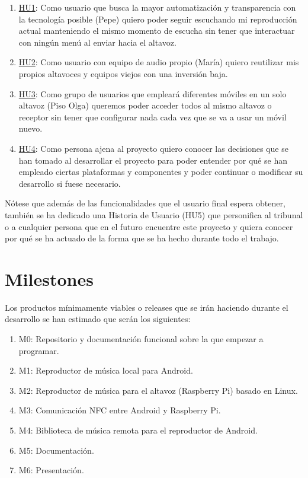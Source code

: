 \begin{enumerate}
    \item \href{https://github.com/migueorg/One-touch-music-streaming-TFG-ETSIIT/issues/10}{HU1}: Como usuario que busca la mayor automatización y transparencia
    con la tecnología posible (Pepe) quiero poder seguir escuchando mi
    reproducción actual manteniendo el mismo momento de escucha sin tener que
    interactuar con ningún menú al enviar hacia el altavoz.
    \item \href{https://github.com/migueorg/One-touch-music-streaming-TFG-ETSIIT/issues/11}{HU2}: Como usuario con equipo de audio propio (María) quiero reutilizar
    mis propios altavoces y equipos viejos con una inversión baja.
    \item \href{https://github.com/migueorg/One-touch-music-streaming-TFG-ETSIIT/issues/13}{HU3}: Como grupo de usuarios que empleará diferentes móviles en un solo
    altavoz (Piso Olga) queremos poder acceder todos al mismo altavoz o receptor
    sin tener que configurar nada cada vez que se va a usar un móvil nuevo.
    \item \href{https://github.com/migueorg/One-touch-music-streaming-TFG-ETSIIT/issues/14}{HU4}: Como persona ajena al proyecto quiero conocer las decisiones que
    se han tomado al desarrollar el proyecto para poder entender por qué se han
    empleado ciertas plataformas y componentes y poder continuar o modificar su
    desarrollo si fuese necesario.
\end{enumerate}

Nótese que además de las funcionalidades que el usuario final espera obtener,
también se ha dedicado una Historia de Usuario (HU5) que personifica al tribunal o
a cualquier persona que en el futuro encuentre este proyecto y quiera conocer
por qué se ha actuado de la forma que se ha hecho durante todo el trabajo.

\section{Milestones}
Los productos mínimamente viables o releases que se irán haciendo durante el
desarrollo se han estimado que serán los siguientes:

\begin{enumerate}
    \item M0: Repositorio y documentación funcional sobre la que empezar a programar.
    \item M1: Reproductor de música local para Android.
    \item M2: Reproductor de música para el altavoz (Raspberry Pi) basado en Linux.
    \item M3: Comunicación NFC entre Android y Raspberry Pi.
    \item M4: Biblioteca de música remota para el reproductor de Android.
    \item M5: Documentación.
    \item M6: Presentación.
\end{enumerate}